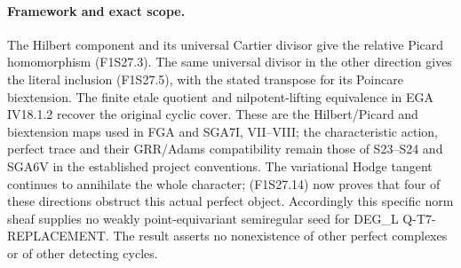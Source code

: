 \paragraph{Framework and exact scope.}
The Hilbert component and its universal Cartier divisor
give the relative Picard homomorphism (F1S27.3).
The same universal divisor in the other direction gives
the literal inclusion (F1S27.5), with the stated transpose
for its Poincare biextension. The finite etale quotient and
nilpotent-lifting equivalence in EGA IV18.1.2 recover
the original cyclic cover. These are the Hilbert/Picard
and biextension maps used in FGA and SGA7I, VII--VIII;
the characteristic action, perfect trace and their
GRR/Adams compatibility remain those of S23--S24
and SGA6V in the established project conventions.
The variational Hodge tangent continues to annihilate
the whole character; (F1S27.14) now proves that four
of these directions obstruct this actual perfect object.
Accordingly this specific norm sheaf supplies no weakly
point-equivariant semiregular seed for DEG\_L
Q-T7-REPLACEMENT. The result asserts no nonexistence
of other perfect complexes or of other detecting cycles.
